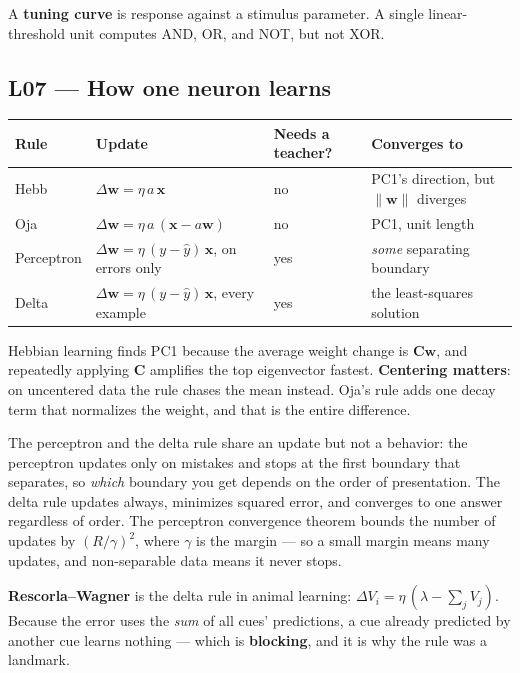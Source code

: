 \documentclass[11pt]{article}
\begin{document}
A \textbf{tuning curve} is response against a stimulus parameter. A single
linear-threshold unit computes AND, OR, and NOT, but not XOR.

\subsection{L07 --- How one neuron learns}

\begin{center}
\begin{tabular}{@{}llll@{}}
\toprule
Rule & Update & Needs a teacher? & Converges to \\
\midrule
Hebb   & $\Delta\boldsymbol{w} = \eta\,a\,\boldsymbol{x}$ & no & PC1's direction, but $\|\boldsymbol{w}\|$ diverges \\
Oja    & $\Delta\boldsymbol{w} = \eta\,a\,(\boldsymbol{x} - a\boldsymbol{w})$ & no & PC1, unit length \\
Perceptron & $\Delta\boldsymbol{w} = \eta\,(y-\hat{y})\,\boldsymbol{x}$, on errors only & yes & \emph{some} separating boundary \\
Delta  & $\Delta\boldsymbol{w} = \eta\,(y-\hat{y})\,\boldsymbol{x}$, every example & yes & the least-squares solution \\
\bottomrule
\end{tabular}
\end{center}

Hebbian learning finds PC1 because the average weight change is
$\boldsymbol{C}\boldsymbol{w}$, and repeatedly applying $\boldsymbol{C}$ amplifies
the top eigenvector fastest. \textbf{Centering matters}: on uncentered data the
rule chases the mean instead. Oja's rule adds one decay term that normalizes the
weight, and that is the entire difference.

The perceptron and the delta rule share an update but not a behavior: the
perceptron updates only on mistakes and stops at the first boundary that
separates, so \emph{which} boundary you get depends on the order of
presentation. The delta rule updates always, minimizes squared error, and
converges to one answer regardless of order. The perceptron convergence theorem
bounds the number of updates by $(R/\gamma)^2$, where $\gamma$ is the margin ---
so a small margin means many updates, and non-separable data means it never
stops.

\textbf{Rescorla--Wagner} is the delta rule in animal learning: $\Delta V_i =
\eta\,(\lambda - \sum_j V_j)$. Because the error uses the \emph{sum} of all
cues' predictions, a cue already predicted by another cue learns nothing ---
which is \textbf{blocking}, and it is why the rule was a landmark.
\end{document}
